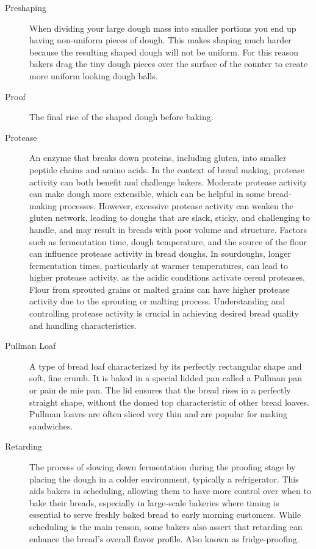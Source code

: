 \begin{description}
\item[Preshaping] When dividing your large dough mass into smaller portions you end
up having non-uniform pieces of dough. This makes shaping much harder because the
resulting shaped dough will not be uniform. For this reason bakers drag the tiny dough
pieces over the surface of the counter to create more uniform looking dough balls.

\item[Proof] The final rise of the shaped dough before baking.

\item[Protease] An enzyme that breaks down proteins, including gluten, into smaller
peptide chains and amino acids. In the context of bread making, protease activity can
both benefit and challenge bakers. Moderate protease activity can make dough more
extensible, which can be helpful in some bread-making processes. However, excessive
protease activity can weaken the gluten network, leading to doughs that are slack,
sticky, and challenging to handle, and may result in breads with poor volume and
structure. Factors such as fermentation time, dough temperature, and the source of the
flour can influence protease activity in bread doughs. In sourdoughs, longer
fermentation times, particularly at warmer temperatures, can lead to higher protease
activity, as the acidic conditions activate cereal proteases. Flour from sprouted
grains or malted grains can have higher protease activity due to the sprouting or
malting process. Understanding and controlling protease activity is crucial in
achieving desired bread quality and handling characteristics.

\item[Pullman Loaf] A type of bread loaf characterized by its perfectly rectangular
shape and soft, fine crumb. It is baked in a special lidded pan called a Pullman pan
or pain de mie pan. The lid ensures that the bread rises in a perfectly straight
shape, without the domed top characteristic of other bread loaves. Pullman loaves are
often sliced very thin and are popular for making sandwiches.

\item[Retarding] The process of slowing down fermentation during the proofing
stage by placing the dough in a colder environment, typically a refrigerator. This aids
bakers in scheduling, allowing them to have more control over when to bake their breads,
especially in large-scale bakeries where timing is essential to serve freshly baked bread
to early morning customers. While scheduling is the main reason, some bakers also assert
that retarding can enhance the bread's overall flavor profile. Also known as
fridge-proofing.


\end{description}
